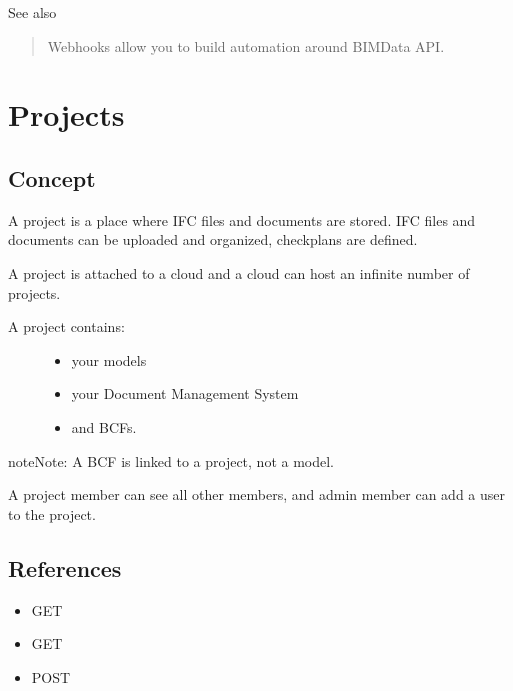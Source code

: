 \documentclass[a4paper,12pt,english]{sphinxmanual}
\begin{document}


See also 
\begin{quote}

Webhooks allow you to build automation around BIMData API.
\end{quote}



\ignorespaces 

\chapter{Projects}
\label{\detokenize{projects:projects}}\label{\detokenize{projects:index-0}}\label{\detokenize{projects::doc}}

\section{Concept}
\label{\detokenize{projects:concept}}
A project is a place where IFC files and documents are stored. IFC files and documents can be uploaded and organized, checkplans are defined.

A project is attached to a cloud and a cloud can host an infinite number of projects.
\begin{description}
\item[{A project contains:}] \leavevmode\begin{itemize}
\item {} 
your models

\item {} 
your Document Management System

\item {} 
and BCFs.

\end{itemize}

\end{description}

\begin{sphinxadmonition}{note}{Note:}
A BCF is linked to a project, not a model.
\end{sphinxadmonition}

A project member can see all other members, and admin member can add a user to the project.


\section{References}
\label{\detokenize{projects:references}}\begin{itemize}
\item {} 
GET 

\item {} 
GET 

\item {} 
POST 

\end{itemize}
\end{document}
